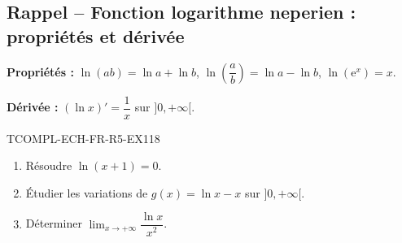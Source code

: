 

\subsection*{Rappel -- Fonction logarithme neperien : propriétés et dérivée}

\textbf{Propriétés :} $\ln(ab) = \ln a + \ln b$, $\ln\left(\dfrac{a}{b}\right) = \ln a - \ln b$, $\ln(\mathrm{e}^x) = x$.

\textbf{Dérivée :} $(\ln x)' = \dfrac{1}{x}$ sur $]0, +\infty[$.

\begin{exercice}{TCOMPL-ECH-FR-R5-EX1}{1}{8}
\begin{enumerate}
  \item Résoudre $\ln(x + 1) = 0$.
  \item Étudier les variations de $g(x) = \ln x - x$ sur $]0, +\infty[$.
  \item Déterminer $\lim_{x \to +\infty} \dfrac{\ln x}{x^2}$.
\end{enumerate}
\end{exercice}

